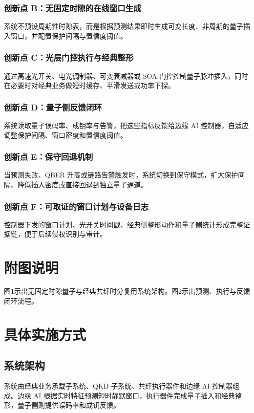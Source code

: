 ﻿\documentclass[12pt,a4paper]{article}
\begin{document}
\subsubsection{创新点 B：无固定时隙的在线窗口生成}
系统不预设周期性时隙表，而是根据预测结果即时生成可变长度、非周期的量子插入窗口，并配置保护间隔与置信度阈值。

\subsubsection{创新点 C：光层门控执行与经典整形}
通过高速光开关、电光调制器、可变衰减器或 SOA 门控控制量子脉冲插入，同时在必要时对经典业务做短时缓存、平滑发送或功率下探。

\subsubsection{创新点 D：量子侧反馈闭环}
系统读取量子误码率、成钥率与告警，把这些指标反馈给边缘 AI 控制器，自适应调整保护间隔、窗口密度和置信度阈值。

\subsubsection{创新点 E：保守回退机制}
当预测失败、QBER 升高或链路告警触发时，系统切换到保守模式，扩大保护间隔、降低插入密度或直接回退到独立量子通道。

\subsubsection{创新点 F：可取证的窗口计划与设备日志}
控制器下发的窗口计划、光开关时间戳、经典侧整形动作和量子侧统计形成完整证据链，便于后续侵权识别与审计。

\section{附图说明}
图1示出无固定时隙量子与经典共纤时分复用系统架构。图2示出预测、执行与反馈闭环流程。

\section{具体实施方式}
\subsection{系统架构}
系统由经典业务承载子系统、QKD 子系统、共纤执行器件和边缘 AI 控制器组成。边缘 AI 根据实时特征预测短时静默窗口，执行器件完成量子插入和经典整形，量子侧则提供误码率和成钥反馈。
\end{document}
